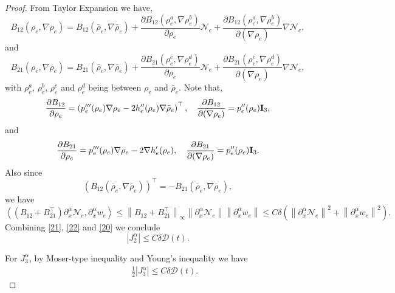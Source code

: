 \documentclass[10pt,a4paper]{amsart}
\newcommand{\al}{\alpha}
\newcommand{\pa}{\partial}
\begin{document}
\begin{proof}
From Taylor Expansion we have,
\begin{equation*}
    B_{12}(\rho_e,\nabla\rho_e)=B_{12}(\bar{\rho}_e,\nabla \bar{\rho}_e)+\frac{\partial B_{12}(\rho_e^a,\nabla \rho_e^b)}{\partial \rho_e}\mathcal{N}_e+\frac{\partial B_{12}(\rho_e^a,\nabla \rho_e^b)}{\partial (\nabla \rho_e)}\nabla \mathcal{N}_e,
\end{equation*}
and
\begin{equation*}
    B_{21}(\rho_e,\nabla\rho_e)=B_{21}(\bar{\rho}_e,\nabla \bar{\rho}_e)+\frac{\partial B_{21}(\rho_e^c,\nabla \rho_e^d)}{\partial \rho_e}\mathcal{N}_e+\frac{\partial B_{21}(\rho_e^c,\nabla \rho_e^d)}{\partial (\nabla \rho_e)}\nabla \mathcal{N}_e,
\end{equation*}
with $\rho_e^a$, $\rho_e^b$, $\rho_e^c$ and $\rho_e^d$ being between $\rho_e$ and $\bar{\rho}_e$.
Note that,
\begin{equation*}
\frac{\partial B_{12}}{\partial \rho_e}=\left( p_e'''(\rho_e)\nabla \rho_e-2h''_e(\rho_e) \nabla \bar{\rho}_e \right )^\top,\quad 
\frac{\partial B_{12}}{\partial (\nabla \rho_e)}=p_e''(\rho_e){\bf{I}}_3,
\end{equation*}
and
\begin{equation*}
\frac{\partial B_{21}}{\partial \rho_e}= p_e'''(\rho_e)\nabla \rho_e-2\nabla h'_e(\rho_e),\quad 
\frac{\partial B_{21}}{\partial (\nabla \rho_e)}=p_e''(\rho_e){\bf{I}}_3.
\end{equation*}
Also since
\begin{equation*}
    \left (B_{12}(\bar{\rho}_e,\nabla \bar{\rho}_e) \right)^\top=-B_{21}(\bar{\rho}_e,\nabla \bar{\rho}_e),
\end{equation*}
we have
\begin{equation}\label{20}
    \left< (B_{12}+B_{21}^\top) \pa_x^\al\mathcal{N}_e ,\pa_x^\al w_e \right> \leq \left\|B_{12}+B_{21}^\top \right\|_\infty \left\|\pa_x^\al \mathcal{N}_e\right\| \left\|\pa_x^\al w_e\right\| \leq C\delta \left (\left\|\pa_x^\al \mathcal{N}_e\right\|^2+\left\|\pa_x^\al w_e\right\|^2 \right).
\end{equation}
Combining \eqref{21}, \eqref{22} and \eqref{20} we conclude
\begin{equation}\label{23}
    |J_2^\alpha| \leq C\delta \mathcal{D}(t).
\end{equation}

For $J_3^\alpha$, by Moser-type inequality and Young's inequality we have
\begin{eqnarray}\label{24}
        &&\frac{1}{2}|J_3^\alpha| \nonumber \leq C\delta \mathcal{D}(t).
\end{eqnarray}


\end{proof}
\end{document}
